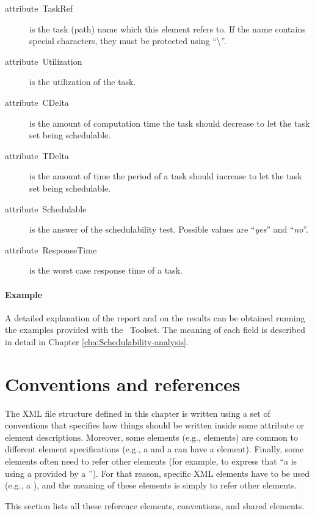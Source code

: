 \begin{description}
\item [{attribute~TaskRef}] is the task (path) name which this element
  refers to. If the  name contains special characters,
  they must be protected using {}``\textbackslash{}''.
\item [{attribute~Utilization}] is the utilization of the task.
\item [{attribute~CDelta}] is the amount of computation time the task
  should decrease to let the task set being schedulable.
\item [{attribute~TDelta}] is the amount of time the period of a task
  should increase to let the task set being schedulable.
\item [{attribute~Schedulable}] is the answer of the schedulability
  test.  Possible values are {}``\emph{yes}'' and {}``\emph{no}''.
\item [{attribute~ResponseTime}] is the worst case response time of a
  task.
\end{description}

\paragraph{Example}

A detailed explanation of the report and on the results can be
obtained running the examples provided with the \rtd\ Toolset. The
meaning of each field is described in detail in Chapter
\ref{cha:Schedulability-analysis}.


\section{Conventions and references}

The XML file structure defined in this chapter is written using a set
of conventions that specifies how things should be written inside some
attribute or element descriptions. Moreover, some elements (e.g.,
 elements) are common to different element
specifications (e.g., a  and a  can have a
 element). Finally, some elements often need to refer
other elements (for example, to express that {}``a  is
using a  provided by a ''). For that reason,
specific XML elements have to be used (e.g., a ), and
the meaning of these elements is simply to refer other elements.

This section lists all these reference elements, conventions, and
shared elements.


